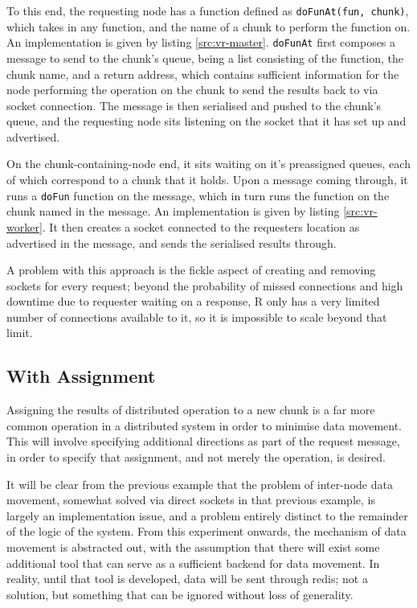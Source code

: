 \documentclass[a4paper,10pt]{article}
\begin{document}
To this end, the requesting node has a function defined as \texttt{doFunAt(fun,
chunk)}, which takes in any function, and the name of a chunk to perform the
function on.
An implementation is given by listing \ref{src:vr-master}.
\texttt{doFunAt} first composes a message to send to the chunk's queue, being a
list consisting of the function, the chunk name, and a return address, which
contains sufficient information for the node performing the operation on the
chunk to send the results back to via socket connection.
The message is then serialised and pushed to the chunk's queue, and the
requesting node sits listening on the socket that it has set up and advertised.

On the chunk-containing-node end, it sits waiting on it's preassigned queues,
each of which correspond to a chunk that it holds. Upon a message coming
through, it runs a \texttt{doFun} function on the message, which in turn runs
the function on the chunk named in the message. 
An implementation is given by listing \ref{src:vr-worker}.
It then creates a socket connected to the requesters location as advertised in
the message, and sends the serialised results through.

A problem with this approach is the fickle aspect of creating and removing
sockets for every request; beyond the probability of missed connections and
high downtime due to requester waiting on a response, R only has a very limited
number of connections available to it, so it is impossible to scale beyond that
limit.

\subsection{With Assignment}

Assigning the results of distributed operation to a new chunk is a far more
common operation in a distributed system in order to minimise data movement.
This will involve specifying additional directions as part of the request
message, in order to specify that assignment, and not merely the operation, is
desired.

It will be clear from the previous example that the problem of inter-node data
movement, somewhat solved via direct sockets in that previous example, is
largely an implementation issue, and a problem entirely distinct to the
remainder of the logic of the system.
From this experiment onwards, the mechanism of data movement is abstracted out,
with the assumption that there will exist some additional tool that can serve
as a sufficient backend for data movement.
In reality, until that tool is developed, data will be sent through redis; not
a solution, but something that can be ignored without loss of generality.
\end{document}
